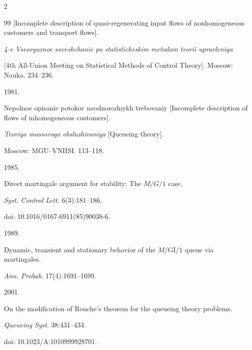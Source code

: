 \begin{multicols}{2}
{{\begin{thebibliography}{99}
[Incomplete description of quasi-regenerating input flows of nonhomogeneous customers and transport flows].

\textit{4-e Vsesoyuznoe soveshchanie po statisticheskim metodam teorii upravleniya} 

[4th All-Union Meeting on Statistical Methods of Control Theory]. Moscow: Nauka. 234--236.







 1981. 

Nepolnoe opisanie potokov neodnorodnykh trebovaniy [Incomplete description of flows of inhomogeneous customers].

\textit{Teoriya  massovogo obsluzhivaniya} [Queueing theory].

Moscow: MGU--VNIISI. 113--118.





 1985.

Direct martingale argument for stability: The $M/G/1$ case. 

\textit{Syst. Control Lett.} 6(3):181--186.

doi: 10.1016/0167-6911(85)90038-6.





 1989.

Dynamic, transient and stationary behavior of the $M/\mathrm{GI}/1$ queue via martingales.

\textit{Ann. Probab.} 17(4):1691--1699.





 2001. 

On the modification of Rouche's theorem for the queueing theory problems. 

\textit{Queueing Syst.} 38:431--434.

doi: 10.1023/A:1010999928701.









\end{thebibliography}



 }

 }



\end{multicols}



